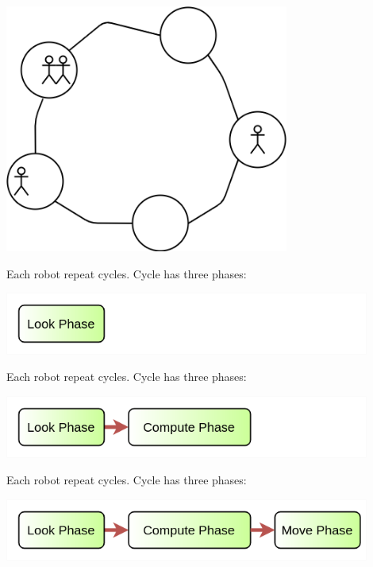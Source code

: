 \documentclass{beamer}
\begin{document}
\begin{frame}
	\begin{center}
		\includegraphics[width=0.7\textwidth]{images/init3.png}
	\end{center}
\end{frame}

\begin{frame}
	Each robot repeat cycles. Cycle has three phases:
	\begin{center}
		\includegraphics[width=0.9\textwidth]{images/cycle1.png}
	\end{center}
\end{frame}
\begin{frame}
	Each robot repeat cycles. Cycle has three phases:
	\begin{center}
		\includegraphics[width=0.9\textwidth]{images/cycle2.png}
	\end{center}
\end{frame}
\begin{frame}
	Each robot repeat cycles. Cycle has three phases:
	\begin{center}
		\includegraphics[width=0.9\textwidth]{images/cycle3.png}
	\end{center}
\end{frame}
\end{document}
